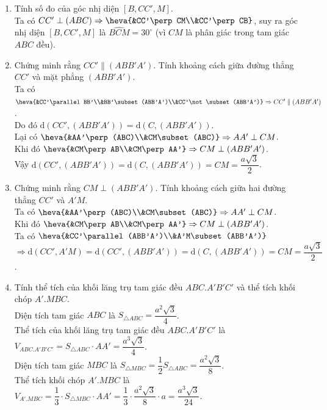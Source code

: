 \begin{bt}
{\begin{enumerate}
	Ta có $AA'\perp (ABC)$, suy ra $AB$ là hình chiếu vuông góc của $A'B$ lên mặt phẳng $(ABC)$.\\
	Do đó góc giữa đường thẳng $A'B$ và mặt phẳng $(ABC)$ là $(A'B,AB)=\widehat{A'BA}=45^\circ$ (vì tam giác $A'AB$ vuông cân tại $A$).
	\item Tính số đo của góc nhị diện $[B,CC',M]$.\\
	Ta có $CC'\perp (ABC)\Rightarrow \heva{&CC'\perp CM\\&CC'\perp CB}$, suy ra góc nhị diện $[B,CC',M]$ là $\widehat{BCM}=30^\circ$ (vì $CM$ là phân giác trong tam giác $ABC$ đều).
	\item Chứng minh rằng $CC'\parallel (ABB'A')$. Tính khoảng cách giữa đường thẳng $CC'$ và mặt phẳng $(ABB'A')$.\\
	Ta có $\heva{&CC'\parallel BB'\\&BB'\subset (ABB'A')\\&CC'\not\subset (ABB'A')}\Rightarrow CC'\parallel (ABB'A')$.\\ Do đó $\mathrm{d}(CC',(ABB'A'))=\mathrm{d}(C,(ABB'A'))$.\\
	Lại có $\heva{&AA'\perp (ABC)\\&CM\subset (ABC)}\Rightarrow AA'\perp CM$.\\
	Khi đó $\heva{&CM\perp AB\\&CM\perp AA'}\Rightarrow CM\perp (ABB'A')$.\\
	Vậy $\mathrm{d}(CC',(ABB'A'))=\mathrm{d}(C,(ABB'A'))=CM=\dfrac{a\sqrt{3}}{2}$.
	\item Chứng minh rằng $CM\perp (ABB'A')$. Tính khoảng cách giữa hai đường thẳng $CC'$ và $A'M$.\\
	Ta có $\heva{&AA'\perp (ABC)\\&CM\subset (ABC)}\Rightarrow AA'\perp CM$.\\
	Khi đó $\heva{&CM\perp AB\\&CM\perp AA'}\Rightarrow CM\perp (ABB'A')$.\\
	Ta có $\heva{&CC'\parallel (ABB'A')\\&A'M\subset (ABB'A')}$\\
	$\Rightarrow \mathrm{d}(CC',A'M)=\mathrm{d}(CC',(ABB'A'))=\mathrm{d}(C,(ABB'A'))=CM=\dfrac{a\sqrt{3}}{2}$.
	\item Tính thể tích của khối lăng trụ tam giác đều $ABC.A'B'C'$ và thể tích khối chóp $A'.MBC$.\\
	Diện tích tam giác $ABC$ là $S_{\triangle {ABC}}=\dfrac{a^2\sqrt{3}}{4}$.\\
	Thể tích của khối lăng trụ tam giác đều $ABC.A'B'C'$ là $V_{ABC.A'B'C'}=S_{\triangle {ABC}}\cdot AA'=\dfrac{a^3\sqrt{3}}{4}$.\\
	Diện tích tam giác $MBC$ là $S_{\triangle {MBC}}=\dfrac{1}{2}S_{\triangle{ABC}}=\dfrac{a^2\sqrt{3}}{8}$.\\
	Thể tích khối chóp $A'.MBC$ là $V_{A'.MBC}=\dfrac{1}{3}\cdot S_{\triangle{MBC}}\cdot AA'=\dfrac{1}{3}\cdot \dfrac{a^2\sqrt{3}}{8}\cdot a=\dfrac{a^3\sqrt{3}}{24}$.
	\end{enumerate}
	}
\end{bt}
